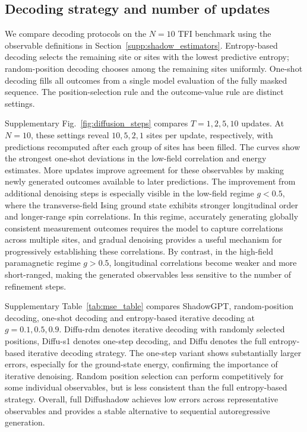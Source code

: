 \documentclass[11pt,a4paper]{article}
\newcommand{\TBD}[1]{\textcolor{red!70!black}{\textsf{[TBD: #1]}}}
\newcommand{\subhead}[1]{\subsection*{#1}}
\begin{document}
\subhead{Decoding strategy and number of updates}
We compare decoding protocols on the $N=10$ TFI benchmark using the
observable definitions in Section~\ref{supp:shadow_estimators}. Entropy-based decoding selects
the remaining site or sites with the lowest predictive entropy;
random-position decoding chooses among the remaining sites uniformly.
One-shot decoding fills all outcomes from a single model evaluation of
the fully masked sequence. The position-selection rule and the
outcome-value rule are distinct settings. 

Supplementary Fig.~\ref{fig:diffusion_steps} compares $T=1,2,5,10$ updates. At $N=10$, these
settings reveal $10,5,2,1$ sites per update, respectively, with
predictions recomputed after each group of sites has been filled.
The curves show the strongest
one-shot deviations in the low-field correlation and energy estimates.
More updates improve agreement for these observables by making newly
generated outcomes available to later predictions. The improvement from additional denoising steps is especially visible in the low-field regime \(g < 0.5\), where the transverse-field Ising ground state exhibits stronger longitudinal order and longer-range spin correlations. In this regime, accurately generating globally consistent measurement outcomes requires the model to capture correlations across multiple sites, and gradual denoising provides a useful mechanism for progressively establishing these correlations. By contrast, in the high-field paramagnetic regime \(g > 0.5\), longitudinal correlations become weaker and more short-ranged, making the generated observables less sensitive to the number of refinement steps.

Supplementary Table~\ref{tab:mse_table} compares ShadowGPT, random-position
decoding, one-shot decoding and entropy-based iterative decoding at
$g=0.1,0.5,0.9$. Diffu-rdm denotes iterative decoding with randomly selected positions, Diffu-s1 denotes one-step decoding, and Diffu denotes the full entropy-based iterative decoding strategy. The one-step variant shows substantially larger errors, especially for the ground-state energy, confirming the importance of iterative denoising. Random position selection can perform competitively for some individual observables, but is less consistent than the full entropy-based strategy. Overall, full Diffushadow achieves low errors across representative observables and provides a stable alternative to sequential autoregressive generation.
\end{document}
